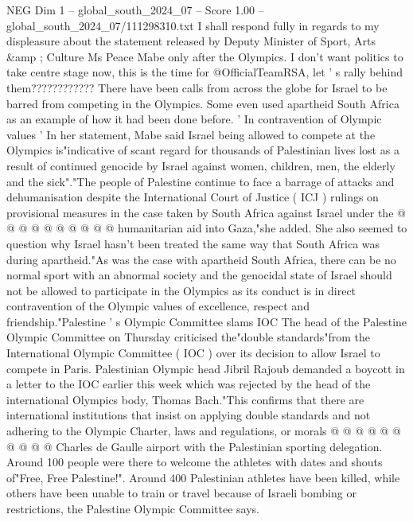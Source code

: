 \begin{textsample}{NEG Dim 1 – global\_south\_2024\_07 – Score 1.00 – global\_south\_2024\_07/111298310.txt}  \label{ex:f1_neg_389}
I shall respond fully in regards to my displeasure about the statement released by Deputy Minister of Sport, Arts \&amp ; Culture Ms Peace Mabe only after the Olympics.
I don't want politics to take centre stage now, this is the time for @OfficialTeamRSA, let ' s rally behind them????????????
There have been calls from across the globe for Israel to be barred from competing in the Olympics.
Some even used apartheid South Africa as an example of how it had been done before. ' In contravention of Olympic values ' In her statement, Mabe said Israel being allowed to compete at the Olympics is"indicative of scant regard for thousands of Palestinian lives lost as a result of continued genocide by Israel against women, children, men, the elderly and the sick"."The people of Palestine continue to face a barrage of attacks and dehumanisation despite the International Court of Justice ( ICJ ) rulings on provisional measures in the case taken by South Africa against Israel under the @ @ @ @ @ @ @ @ @ @ humanitarian aid into Gaza,"she added.
She also seemed to question why Israel hasn't been treated the same way that South Africa was during apartheid."As was the case with apartheid South Africa, there can be no normal sport with an abnormal society and the genocidal state of Israel should not be allowed to participate in the Olympics as its conduct is in direct contravention of the Olympic values of excellence, respect and friendship."Palestine ' s Olympic Committee slams IOC The head of the Palestine Olympic Committee on Thursday criticised the"double standards"from the International Olympic Committee ( IOC ) over its decision to allow Israel to compete in Paris.
Palestinian Olympic head Jibril Rajoub demanded a boycott in a letter to the IOC earlier this week which was rejected by the head of the international Olympics body, Thomas Bach."This confirms that there are international institutions that insist on applying double standards and not adhering to the Olympic Charter, laws and regulations, or morals @ @ @ @ @ @ @ @ @ @ Charles de Gaulle airport with the Palestinian sporting delegation.
Around 100 people were there to welcome the athletes with dates and shouts of"Free, Free Palestine!".
Around 400 Palestinian athletes have been killed, while others have been unable to train or travel because of Israeli bombing or restrictions, the Palestine Olympic Committee says.

\end{textsample}
